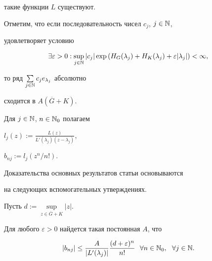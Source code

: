 такие функции $L$ существуют.





Отметим, что если последовательность чисел $c_j$, $j\in\Bbb N$,


удовлетворяет условию


\begin{equation}


\label{1}


\exists\varepsilon>0:


\sup\limits_{j\in\Bbb N}|c_j|\exp{(H_G(\lambda_j)+H_K(\lambda_j)+


\varepsilon|\lambda_j|)}<\infty,


\end{equation}


то ряд $\sum\limits_{j\in\Bbb N}c_j e_{\lambda_j}$ абсолютно


сходится в $A(\overline G+K)$.





Для $j\in\Bbb N$, $n\in\Bbb N_0$ полагаем


$l_j(z):=\frac{L(z)}{L'(\lambda_j)(z-\lambda_j)}$,


$b_{nj}:=l_j(z^{n}/n!)$.





Доказательства основных результатов статьи основываются


на следующих вспомогательных утверждениях.





\begin{lem}


Пусть $d:=\sup\limits_{z\in \overline{G}+K}|z|$.


Для любого $\varepsilon>0$ найдется такая постоянная $A$, что


\begin{equation}


\label{2}


|b_{nj}|\le \displaystyle\frac{A}


{|L'(\lambda_j)|}


\frac{(d+\varepsilon)^{n}}{n!}\ \ \forall n\in\Bbb N_0,\ \ \forall


j\in\Bbb N.


\end{equation}


\end{lem}





